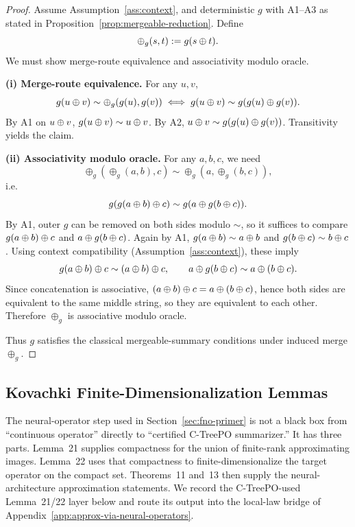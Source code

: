 \begin{proof}
Assume Assumption~\ref{ass:context}, and deterministic $g$ with A1--A3 as stated in Proposition~\ref{prop:mergeable-reduction}. Define
\[
\oplus_g(s,t):=g(s\oplus t).
\]
We must show merge-route equivalence and associativity modulo oracle.

\textbf{(i) Merge-route equivalence.}
For any $u,v$,
\[
g(u\oplus v)\sim \oplus_g(g(u),g(v))
  \iff g(u\oplus v)\sim g(g(u)\oplus g(v)).
\]
By A1 on $u\oplus v$, $g(u\oplus v)\sim u\oplus v$.
By A2, $u\oplus v\sim g(g(u)\oplus g(v))$.
Transitivity yields the claim.

\textbf{(ii) Associativity modulo oracle.}
For any $a,b,c$, we need
\[
\oplus_g(\oplus_g(a,b),c)\sim \oplus_g(a,\oplus_g(b,c)),
\]
i.e.
\[
g(g(a\oplus b)\oplus c)\sim g(a\oplus g(b\oplus c)).
\]
By A1, outer $g$ can be removed on both sides modulo $\sim$, so it suffices to compare
$g(a\oplus b)\oplus c$ and $a\oplus g(b\oplus c)$.
Again by A1, $g(a\oplus b)\sim a\oplus b$ and $g(b\oplus c)\sim b\oplus c$.
Using context compatibility (Assumption~\ref{ass:context}), these imply
\[
g(a\oplus b)\oplus c \sim (a\oplus b)\oplus c,\qquad
a\oplus g(b\oplus c)\sim a\oplus(b\oplus c).
\]
Since concatenation is associative, $(a\oplus b)\oplus c = a\oplus(b\oplus c)$, hence both sides are equivalent to the same middle string, so they are equivalent to each other.
Therefore $\oplus_g$ is associative modulo oracle.

Thus $g$ satisfies the classical mergeable-summary conditions under induced merge $\oplus_g$.
\end{proof}

\subsection{Kovachki Finite-Dimensionalization Lemmas}\label{app:kovachki-finite-dimensionalization}

The neural-operator step used in Section~\ref{sec:fno-primer} is not a
black box from ``continuous operator'' directly to ``certified
C-TreePO summarizer.'' It has three parts. Lemma~21 supplies compactness
for the union of finite-rank approximating images. Lemma~22 uses that
compactness to finite-dimensionalize the target operator on the compact
set. Theorems~11 and~13 then supply the neural-architecture
approximation statements. We record the C-TreePO-used Lemma~21/22 layer
below and route its output into the local-law bridge of
Appendix~\ref{app:approx-via-neural-operators}.

